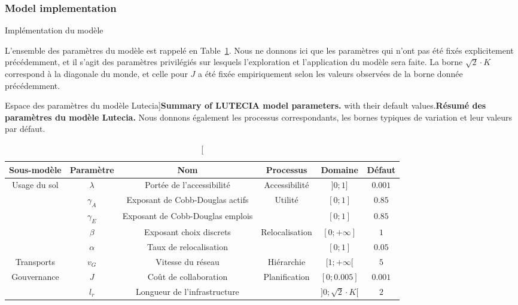 \subsubsection{Model implementation}{Implémentation du modèle}


L'ensemble des paramètres du modèle est rappelé en Table~\ref{tab:lutecia:parameters}. Nous ne donnons ici que les paramètres qui n'ont pas été fixés explicitement précédemment, et il s'agit des paramètres privilégiés sur lesquels l'exploration et l'application du modèle sera faite. La borne $\sqrt{2}\cdot K$ correspond à la diagonale du monde, et celle pour $J$ a été fixée empiriquement selon les valeurs observées de la borne donnée précédemment.


\begin{table}
\caption[Summary of LUTECIA model parameters][Espace des paramètres du modèle Lutecia]{\textbf{Summary of LUTECIA model parameters.} with their default values.\label{tab:lutecia:parameters}}{\textbf{Résumé des paramètres du modèle Lutecia.} Nous donnons également les processus correspondants, les bornes typiques de variation et leur valeurs par défaut.\label{tab:lutecia:parameters}}
\begin{tabular}{|c|c|c|c|c|c|}
  \hline
 Sous-modèle & Paramètre & Nom & Processus & Domaine & Défaut\\
  \hline
\multirow{5}{*}{Usage du sol}& $\lambda$ & Portée de l'accessibilité & Accessibilité & $]0;1]$ & $0.001$ \\\cline{2-6}
 & $\gamma_A$ & Exposant de Cobb-Douglas actifs & \multirow{2}{*}{Utilité} & $[0;1]$ & $0.85$ \\\cline{2-3}\cline{5-6}
 & $\gamma_E$ & Exposant de Cobb-Douglas emplois &  & $[0;1]$ & $0.85$ \\\cline{2-6}
 & $\beta$ & Exposant choix discrets & \multirow{2}{*}{Relocalisation} & $[0;+\infty]$ & $1$ \\\cline{2-3}\cline{5-6}
 & $\alpha$ & Taux de relocalisation &  & $[0;1]$ & $0.05$ \\\hline
Transports & $v_G$ & Vitesse du réseau & Hiérarchie & $[1;+\infty [$ & $5$ \\\hline
\multirow{2}{*}{Gouvernance} & $J$ & Coût de collaboration & \multirow{2}{*}{Planification} & $[0;0.005]$ & $0.001$ \\\cline{2-3}\cline{5-6}
 & $l_r$ & Longueur de l'infrastructure &  & $]0;\sqrt{2}\cdot K [$ & $2$ \\\hline
\end{tabular}
\end{table}



